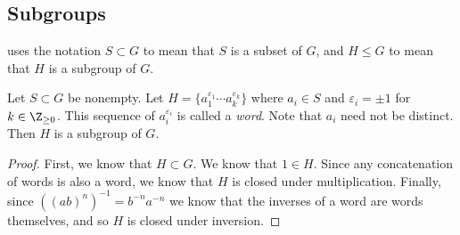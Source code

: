 \subsection{Subgroups}

\cite{DF} uses the notation $S \subset G$ to mean that $S$ is a subset of $G$, and $H \leq G$ to mean that $H$ is a subgroup of $G$.

\begin{definition}[Subgroup]
Let $S \subset G$ be nonempty. Let $H = \{a_1^{\varepsilon_1}\cdots a_k^{\varepsilon_k}\}$ where $a_i \in S$ and $\varepsilon_i = \pm 1$ for $k \in \Z_{\geq 0}$. This sequence of $a_i^{\varepsilon_i}$ is called a \emph{word}. Note that $a_i$ need not be distinct. Then $H$ is a subgroup of $G$.
\end{definition}

\begin{proof}
First, we know that $H \subset G$. We know that $1 \in H$. Since any concatenation of words is also a word, we know that $H$ is closed under multiplication. Finally, since $((ab)^n)^{-1} = b^{-n}a^{-n}$ we know that the inverses of a word are words themselves, and so $H$ is closed under inversion.
\end{proof}